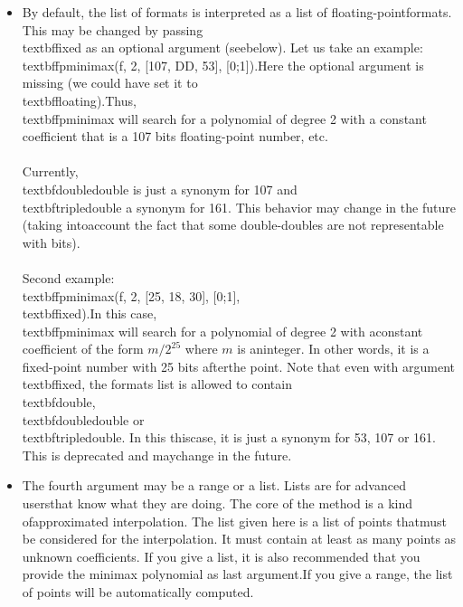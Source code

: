 \begin{itemize}
\item By default, the list of formats is interpreted as a list of floating-point\n   formats. This may be changed by passing \\textbf{fixed} as an optional argument (see\n   below). Let us take an example: \\textbf{fpminimax}(f, 2, [107, DD, 53], [0;1]).\n   Here the optional argument is missing (we could have set it to \\textbf{floating}).\n   Thus, \\textbf{fpminimax} will search for a polynomial of degree 2 with a constant \n   coefficient that is a 107 bits floating-point number, etc.\\\\\n   Currently, \\textbf{doubledouble} is just a synonym for 107 and \\textbf{tripledouble} a \n   synonym for 161. This behavior may change in the future (taking into\n   account the fact that some double-doubles are not representable with bits).\\\\\n   Second example: \\textbf{fpminimax}(f, 2, [25, 18, 30], [0;1], \\textbf{fixed}).\n   In this case, \\textbf{fpminimax} will search for a polynomial of degree 2 with a\n   constant coefficient of the form $m/2^{25}$ where $m$ is an\n   integer. In other words, it is a fixed-point number with 25 bits after\n   the point. Note that even with argument \\textbf{fixed}, the formats list is \n   allowed to contain \\textbf{double}, \\textbf{doubledouble} or \\textbf{tripledouble}. In this this\n   case, it is just a synonym for 53, 107 or 161. This is deprecated and may\n   change in the future.\n
\item The fourth argument may be a range or a list. Lists are for advanced users\n   that know what they are doing. The core of the  method is a kind of\n   approximated interpolation. The list given here is a list of points that\n   must be considered for the interpolation. It must contain at least as \n   many points as unknown coefficients. If you give a list, it is also \n   recommended that you provide the minimax polynomial as last argument.\n   If you give a range, the list of points will be automatically computed.\n

\end{itemize}
